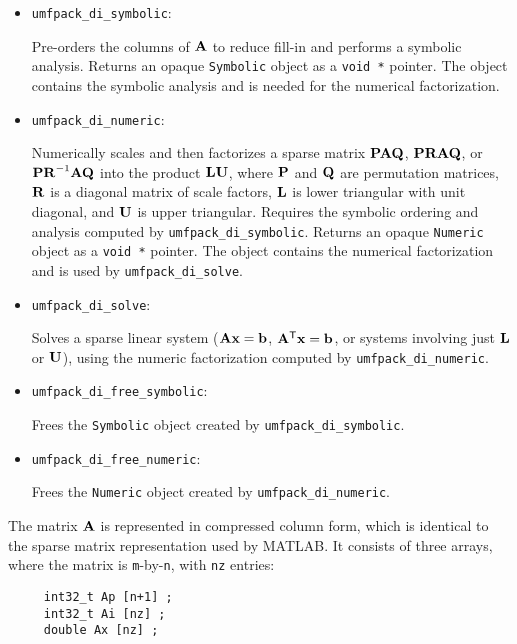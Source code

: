 \documentclass[11pt]{article}
\newcommand{\m}[1]{{\bf{#1}}}       %
\newcommand{\tr}{^{\sf T}}          %
\begin{document}
\begin{itemize}
\item {\tt umfpack\_di\_symbolic}:

    Pre-orders the columns of $\m{A}$ to reduce fill-in and performs a
    symbolic analysis.
    Returns an opaque {\tt Symbolic} object as a {\tt void *}
    pointer.  The object contains the symbolic analysis and is needed for the
    numerical factorization.

\item {\tt umfpack\_di\_numeric}:

    Numerically scales and then factorizes a sparse matrix
    $\m{PAQ}$, $\m{PRAQ}$, or $\m{PR}^{-1}\m{AQ}$ into the product $\m{LU}$,
    where
    $\m{P}$ and $\m{Q}$ are permutation matrices, $\m{R}$ is a diagonal
    matrix of scale factors, $\m{L}$ is lower triangular with unit diagonal,
    and $\m{U}$ is upper triangular.  Requires the
    symbolic ordering and analysis computed by {\tt umfpack\_di\_symbolic}.
    Returns an opaque {\tt Numeric} object as a
    {\tt void *} pointer.  The object contains the numerical factorization and
    is used by {\tt umfpack\_di\_solve}.

\item {\tt umfpack\_di\_solve}:

    Solves a sparse linear system ($\m{Ax}=\m{b}$, $\m{A}\tr\m{x}=\m{b}$, or
    systems involving just $\m{L}$ or $\m{U}$), using the numeric factorization
    computed by {\tt umfpack\_di\_numeric}.

\item {\tt umfpack\_di\_free\_symbolic}:

    Frees the {\tt Symbolic} object created by {\tt umfpack\_di\_symbolic}.

\item {\tt umfpack\_di\_free\_numeric}:

    Frees the {\tt Numeric} object created by {\tt umfpack\_di\_numeric}.

\end{itemize}

The matrix $\m{A}$ is represented in compressed column form, which is
identical to the sparse matrix representation used by MATLAB.  It consists
of three arrays, where the matrix is {\tt m}-by-{\tt n},
with {\tt nz} entries:

{\footnotesize
\begin{verbatim}
     int32_t Ap [n+1] ;
     int32_t Ai [nz] ;
     double Ax [nz] ;
\end{verbatim}
}
\end{document}
